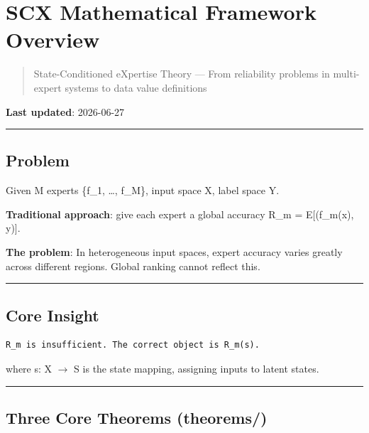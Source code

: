 \documentclass[
  12pt,
]{article}
\author{SCX}
\date{2026}
\begin{document}
\section{SCX Mathematical Framework Overview}\label{scx-mathematical-framework-overview}

\begin{quote}
State-Conditioned eXpertise Theory --- From reliability problems in multi-expert systems to data value definitions
\end{quote}

\textbf{Last updated}: 2026-06-27

\begin{center}\rule{0.5\linewidth}{0.5pt}\end{center}

\subsection{Problem}\label{problem}

Given M experts \{f\_1, \ldots, f\_M\}, input space X, label space Y.

\textbf{Traditional approach}: give each expert a global accuracy R\_m = E[\ell(f\_m(x), y)].

\textbf{The problem}: In heterogeneous input spaces, expert accuracy varies greatly across different regions. Global ranking cannot reflect this.

\begin{center}\rule{0.5\linewidth}{0.5pt}\end{center}

\subsection{Core Insight}\label{core-insight}

\begin{verbatim}
R_m is insufficient. The correct object is R_m(s).
\end{verbatim}

where s: X $\to$ S is the state mapping, assigning inputs to latent states.

\begin{center}\rule{0.5\linewidth}{0.5pt}\end{center}

\subsection{Three Core Theorems (theorems/)}\label{three-core-theorems-theorems}
\end{document}
